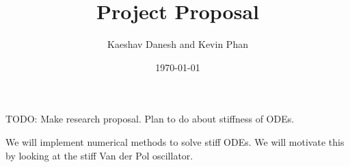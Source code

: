 \documentclass[12pt]{article}
\title{Project Proposal}
\author{Kaeshav Danesh and Kevin Phan}
\date{\today}
\begin{document}
	
	\maketitle
    TODO: Make research proposal. Plan to do about stiffness of ODEs. 

    We will implement numerical methods to solve stiff ODEs. We will motivate this by looking at the stiff Van der Pol oscillator. 
\end{document}
